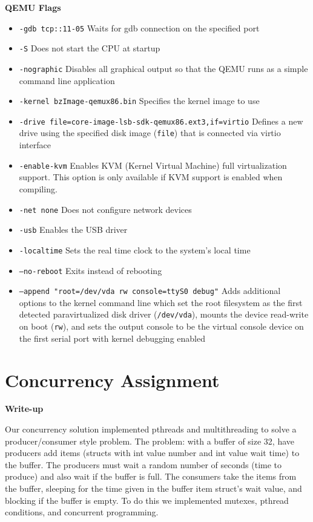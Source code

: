 \documentclass[10pt,letterpaper,draftclsnofoot,onecolumn]{IEEEtran}
\begin{document}
\noindent\textbf{QEMU Flags}
\begin{itemize}
\item \texttt{-gdb tcp::11-05} Waits for gdb connection on the specified port
\item \texttt{-S} Does not start the CPU at startup
\item \texttt{-nographic} Disables all graphical output so that the QEMU runs as a simple command line application
\item \texttt{-kernel bzImage-qemux86.bin} Specifies the kernel image to use
\item \texttt{-drive file=core-image-lsb-sdk-qemux86.ext3,if=virtio} Defines a new drive using the specified disk image (\texttt{file}) that is connected via virtio interface 
\item \texttt{-enable-kvm} Enables KVM (Kernel Virtual Machine) full virtualization support. This option is only available if KVM support is enabled when compiling.
\item \texttt{-net none} Does not configure network devices
\item \texttt{-usb} Enables the USB driver
\item \texttt{-localtime} Sets the real time clock to the system's local time
\item \texttt{--no-reboot} Exits instead of rebooting
\item \texttt{--append "root=/dev/vda rw console=ttyS0 debug"} Adds additional options to the kernel command line which set the root filesystem as the first detected paravirtualized disk driver (\texttt{/dev/vda}), mounts the device read-write on boot (\texttt{rw}), and sets the output console to be the virtual console device on the first serial port with kernel debugging enabled
\end{itemize}\pagebreak

\section{Concurrency Assignment}
\bigskip

\noindent\textbf{Write-up}
\medskip

\medskip

\noindent Our concurrency solution implemented pthreads and multithreading to solve a producer/consumer style problem. The problem: with a buffer of size 32, have producers add items (structs with int value number and int value wait time) to the buffer. The producers must wait a random number of seconds (time to produce) and also wait if the buffer is full. The consumers take the items from the buffer, sleeping for the time given in the buffer item struct's wait value, and blocking if the buffer is empty. To do this we implemented mutexes, pthread conditions, and concurrent programming.\par
\end{document}
